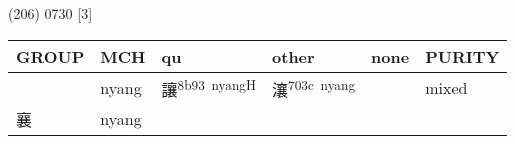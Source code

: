 \documentclass[14pt,a4paper]{scrartcl}
\begin{document}
(206) 0730 {[}3{]}

\begin{longtable}[c]{@{}llllll@{}}
\toprule
\begin{minipage}[b]{0.14\columnwidth}\raggedright\strut
GROUP
\strut\end{minipage} &
\begin{minipage}[b]{0.14\columnwidth}\raggedright\strut
MCH
\strut\end{minipage} &
\begin{minipage}[b]{0.14\columnwidth}\raggedright\strut
qu
\strut\end{minipage} &
\begin{minipage}[b]{0.14\columnwidth}\raggedright\strut
other
\strut\end{minipage} &
\begin{minipage}[b]{0.14\columnwidth}\raggedright\strut
none
\strut\end{minipage} &
\begin{minipage}[b]{0.14\columnwidth}\raggedright\strut
PURITY
\strut\end{minipage}\tabularnewline
\midrule
\endhead
\begin{minipage}[t]{0.14\columnwidth}\raggedright\strut
𧞻
\strut\end{minipage} &
\begin{minipage}[t]{0.14\columnwidth}\raggedright\strut
nyang
\strut\end{minipage} &
\begin{minipage}[t]{0.14\columnwidth}\raggedright\strut
讓\textsuperscript{8b93~nyangH}
\strut\end{minipage} &
\begin{minipage}[t]{0.14\columnwidth}\raggedright\strut
瀼\textsuperscript{703c~nyang}
\strut\end{minipage} &
\begin{minipage}[t]{0.14\columnwidth}\raggedright\strut
\strut\end{minipage} &
\begin{minipage}[t]{0.14\columnwidth}\raggedright\strut
mixed
\strut\end{minipage}\tabularnewline
\begin{minipage}[t]{0.14\columnwidth}\raggedright\strut
襄
\strut\end{minipage} &
\begin{minipage}[t]{0.14\columnwidth}\raggedright\strut
nyang
\strut\end{minipage} &
\begin{minipage}[t]{0.14\columnwidth}\raggedright\strut

\end{minipage}
\end{longtable}
\end{document}
